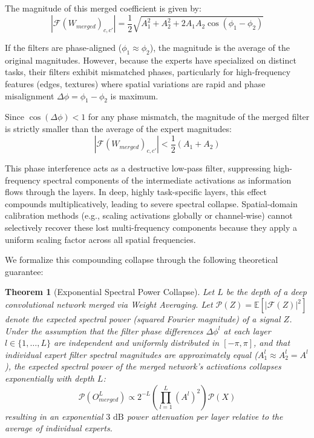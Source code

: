 \documentclass{article}
\newtheorem{theorem}{Theorem}
\begin{document}
The magnitude of this merged coefficient is given by:
\begin{equation}
    | \mathcal{F}(W_{merged})_{c,c'} | = \frac{1}{2} \sqrt{A_1^2 + A_2^2 + 2 A_1 A_2 \cos(\phi_1 - \phi_2)}
\end{equation}

If the filters are phase-aligned ($\phi_1 \approx \phi_2$), the magnitude is the average of the original magnitudes. However, because the experts have specialized on distinct tasks, their filters exhibit mismatched phases, particularly for high-frequency features (edges, textures) where spatial variations are rapid and phase misalignment $\Delta \phi = \phi_1 - \phi_2$ is maximum. 

Since $\cos(\Delta \phi) < 1$ for any phase mismatch, the magnitude of the merged filter is strictly smaller than the average of the expert magnitudes:
\begin{equation}
    | \mathcal{F}(W_{merged})_{c,c'} | < \frac{1}{2} (A_1 + A_2)
\end{equation}

This phase interference acts as a destructive low-pass filter, suppressing high-frequency spectral components of the intermediate activations as information flows through the layers. In deep, highly task-specific layers, this effect compounds multiplicatively, leading to severe spectral collapse. Spatial-domain calibration methods (e.g., scaling activations globally or channel-wise) cannot selectively recover these lost multi-frequency components because they apply a uniform scaling factor across all spatial frequencies.

We formalize this compounding collapse through the following theoretical guarantee:

\begin{theorem}[Exponential Spectral Power Collapse]
Let $L$ be the depth of a deep convolutional network merged via Weight Averaging. Let $\mathcal{P}(Z) = \mathbb{E}[| \mathcal{F}(Z) |^2]$ denote the expected spectral power (squared Fourier magnitude) of a signal $Z$. Under the assumption that the filter phase differences $\Delta \phi^l$ at each layer $l \in \{1, \dots, L\}$ are independent and uniformly distributed in $[-\pi, \pi]$, and that individual expert filter spectral magnitudes are approximately equal ($A_1^l \approx A_2^l = A^l$), the expected spectral power of the merged network's activations collapses exponentially with depth $L$:
\begin{equation}
    \mathcal{P}(O_{merged}^L) \propto 2^{-L} \left( \prod_{l=1}^L (A^l)^2 \right) \mathcal{P}(X)
\end{equation}
resulting in an exponential $3\text{ dB}$ power attenuation per layer relative to the average of individual experts.
\end{theorem}
\end{document}
